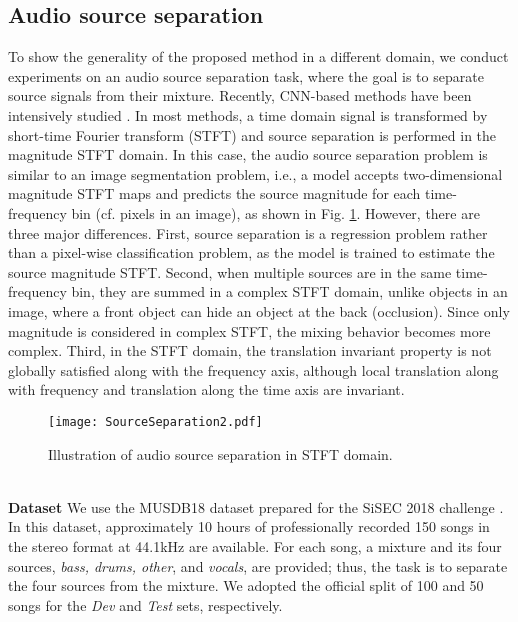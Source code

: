 \documentclass[final]{cvpr}
\begin{document}
\subsection{Audio source separation}
\label{sec:exSS}
To show the generality of the proposed method in a different domain, we conduct experiments on an audio source separation task, where the goal is to separate source signals from their mixture. Recently, CNN-based methods have been intensively studied \cite{Nachmani20,Liu19,stoter19,Samuel20,defossez2019demucs,Takahashi18MMDenseLSTM}. In most methods, a time domain signal is transformed by short-time Fourier transform (STFT) and source separation is performed in the magnitude STFT domain. In this case, the audio source separation problem is similar to an image segmentation problem, i.e., a model accepts two-dimensional magnitude STFT maps and predicts the source magnitude for each time-frequency bin (cf. pixels in an image), as shown in Fig. \ref{fig:sourceseparation}. However, there are three major differences. First, source separation is a regression problem rather than a pixel-wise classification problem, as the model is trained to estimate the source magnitude STFT.  Second, when multiple sources are in the same time-frequency bin, they are summed in a complex STFT domain, unlike objects in an image, where a front object can hide an object at the back (occlusion). 
Since only magnitude is considered in complex STFT, the mixing behavior becomes more complex. Third, in the STFT domain, the translation invariant property is not globally satisfied along with the frequency axis, although local translation along with frequency and translation along the time axis are invariant. 
\begin{figure}[t]
  \centering
  \texttt{[image: SourceSeparation2.pdf]}
  \caption{Illustration of audio source separation in STFT domain.}
  \label{fig:sourceseparation}
\end{figure}
\vspace{3mm}\\
\textbf{Dataset} \hspace{1mm}
We use the MUSDB18 dataset prepared for the SiSEC 2018 challenge \cite{sisec2018}. 
In this dataset, approximately 10 hours of professionally recorded 150 songs in the stereo format at 44.1kHz are available. For each song, a mixture and its four sources, {\it bass, drums, other}, and {\it vocals}, are provided; thus, the task is to separate the four sources from the mixture. We adopted the official split of 100 and 50 songs for the {\it Dev} and {\it Test} sets, respectively.
\end{document}
